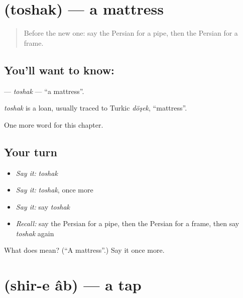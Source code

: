 \section[\texorpdfstring{\fa{تشک} (toshak)}{تشک (toshak)}]{ (toshak) — a mattress}

\label{lesson:FA-C282-toshak}



\begin{quote}
Before the new one: say the Persian for a pipe, then the Persian for a frame.
\end{quote}

\subsection*{You'll want to know: }
\textbf{} — \emph{toshak} — \textquotedblleft{}a mattress\textquotedblright{}.

\begin{cousinweb}
\emph{toshak} is a loan, usually traced to Turkic \emph{döşek}, \textquotedblleft{}mattress\textquotedblright{}.
\end{cousinweb}

\begin{grammarlens}[title={What you've built}]
One more word for this chapter.
\end{grammarlens}

\subsection*{Your turn}
\begin{itemize}
\raggedright
  \item \emph{Say it:} \emph{toshak}
  \item \emph{Say it:} \emph{toshak}, once more
  \item \emph{Say it:} say \emph{toshak}
  \item \emph{Recall:} say the Persian for a pipe, then the Persian for a frame, then say \emph{toshak} again
\end{itemize}

\begin{tcolorbox}[breakable,colback=teal!4,colframe=teal!35!black,title={Before you move on}]
What does  mean? (\textquotedblleft{}A mattress\textquotedblright{}.) Say it once more.
\end{tcolorbox}
\section[\texorpdfstring{\fa{شیر} \fa{آب} (shir-e âb)}{شیر آب (shir-e âb)}]{  (shir-e âb) — a tap}

